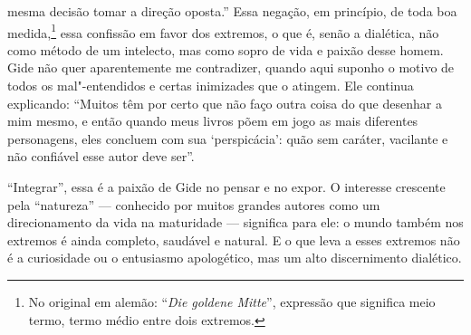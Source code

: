 mesma decisão tomar a direção oposta.'' Essa negação, em princípio, de
toda boa medida,\footnote{No original em alemão: ``\emph{Die goldene Mitte}'', expressão que
  significa meio termo, termo médio entre dois extremos. \versal{[N.~T.]}} essa
confissão em favor dos extremos, o que é, senão a dialética, não como
método de um intelecto, mas como sopro de vida e paixão desse homem.
Gide não quer aparentemente me contradizer, quando aqui suponho o motivo
de todos os mal"-entendidos e certas inimizades que o atingem. Ele
continua explicando: ``Muitos têm por certo que não faço outra coisa do
que desenhar a mim mesmo, e então quando meus livros põem em jogo as
mais diferentes personagens, eles concluem com sua `perspicácia': quão
sem caráter, vacilante e não confiável esse autor deve ser''.

``Integrar'', essa é a paixão de Gide no pensar e no expor. O interesse
crescente pela ``natureza'' --- conhecido por muitos grandes autores como
um direcionamento da vida na maturidade --- significa para ele:
o mundo também nos extremos é ainda completo, saudável e natural. E o
que leva a esses extremos não é a curiosidade ou o entusiasmo
apologético, mas um alto discernimento dialético.

